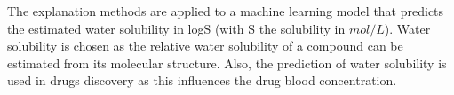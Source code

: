 The explanation methods are applied to a machine learning model that predicts the 
estimated water solubility in logS (with S the solubility in $mol/L$). Water 
solubility is chosen as the relative water solubility of a compound can be estimated 
from its molecular structure. Also, the prediction of water solubility is used 
in drugs discovery as this influences the drug blood concentration.\cite{hill2010getting}
